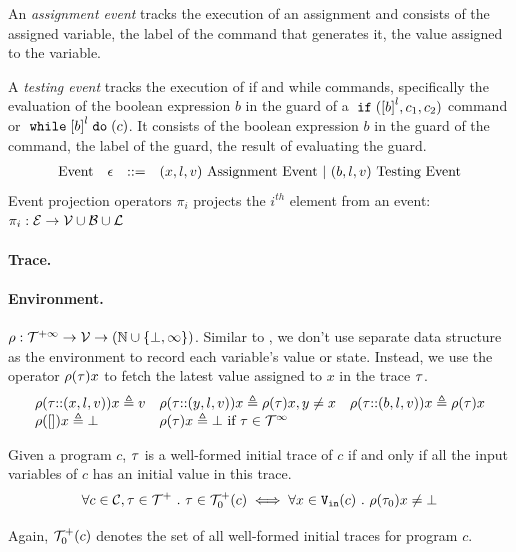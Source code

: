 An \emph{assignment event} tracks the execution of an assignment and consists of the assigned variable, the label of the command that generates it, the value assigned to the variable.

 A \emph{testing event} tracks the execution of if and while commands, specifically the evaluation of the boolean expression $b$ in the guard of a $\eif(\clabel{b}^l, c_1, c_2)$ command or $\ewhile \clabel{b}^l \edo (c)$.
 It consists of the boolean expression $b$ in the guard of the command, the label of the guard, the result of evaluating the guard.
%
\[
\begin{array}{llll}
  \mbox{Event} 
  & \mathtt{\epsilon} & ::= & 
  ({x}, l, v) ~ \mbox{Assignment Event} 
  ~|~(b, l, v) ~ \mbox{Testing Event}
\end{array}
\]
Event projection operators $\pi_i$ projects the $i^{th}$ element from an event: 
$\pi_i : \mathcal{E} \to \mathcal{V} \cup \mathcal{B} \cup \mathcal{L} $

\paragraph{Trace.}

%
\paragraph{Environment.} $\rho : {\mathcal{T}^{+\infty}}  \to \mathcal{V} \to(\mathbb{N} \cup \{\bot, \infty\})$.  
Similar to , we don't use separate data structure as the environment to record each variable's value or state. Instead, we use the operator $\rho (\mathtt{\tau}) x$ to fetch the latest value assigned to $x$ in the trace $\mathtt{\tau}$. 
\[
\begin{array}{lll}
\rho(\mathtt{\tau}  {\small ::} (x, l, v)) x \triangleq v
&
\rho(\mathtt{\tau} {\small ::} (y, l, v)) x \triangleq \rho(\mathtt{\tau}) x, y \neq x
&
\rho(\mathtt{\tau} {\small ::} (b, l, v)) x \triangleq \rho(\mathtt{\tau}) x
\\
\rho({[]} ) x \triangleq \bot
&
\rho(\mathtt{\tau} ) x \triangleq \bot ~ \text{if}~ \mathtt{\tau} \in \mathcal{T}^{\infty}
\end{array}
\]
%
\begin{defn}
  \label{def:initial_trace}
  Given a program $c$, $\mathtt{\tau}$ is a well-formed initial trace of $c$ if and only if all the input variables of $c$ has an initial value in this trace.
  \[
    \forall c \in \mathcal{C}, \mathtt{\tau} \in \mathcal{T}^{+} ~.~ \mathtt{\tau} \in \mathcal{T}^{+}_0(c) \iff 
    \forall x \in {\ensuremath{\mathtt{V_{\mathtt{in}}}}}(c) ~.~ \rho(\mathtt{\tau}_0) x \neq \bot
    \]
\end{defn}
%
Again, $\mathcal{T}^{+}_0(c)$ denotes the set of all well-formed initial traces for program $c$.
%
